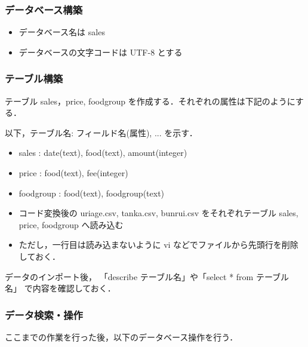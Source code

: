 \subsubsection{データベース構築}

\begin{itemize}
    \item データベース名は sales
    \item データベースの文字コードは UTF-8 とする
\end{itemize}

\subsubsection{テーブル構築}

テーブル sales，price, foodgroup を作成する．それぞれの属性は下記のようにする．

以下，テーブル名: フィールド名(属性), ... を示す．
\begin{itemize}
 \item sales : date(text), food(text), amount(integer)
 \item price : food(text), fee(integer)
 \item foodgroup : food(text), foodgroup(text)
\end{itemize}

\begin{itemize}
 \item コード変換後の uriage.csv, tanka.csv, bunrui.csv をそれぞれテーブル sales, price, foodgroup へ読み込む
 \item ただし，一行目は読み込まないように vi などでファイルから先頭行を削除しておく．
\end{itemize}

データのインポート後， 「describe テーブル名」や「select * from テーブル名」
で内容を確認しておく．

\subsubsection{データ検索・操作}

ここまでの作業を行った後，以下のデータベース操作を行う．


